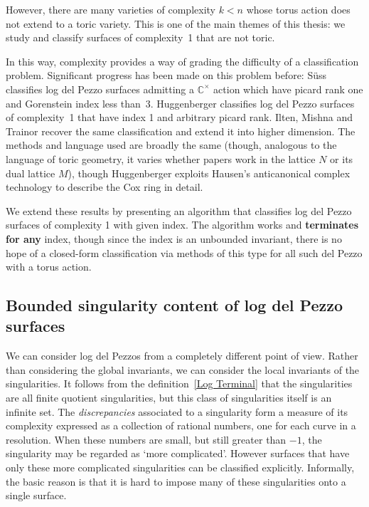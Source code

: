 \documentclass[12pt,a4paper]{book}      %
\theoremstyle{definition}
\begin{document}
However, there are many varieties of complexity $k<n$ whose torus action does not extend to a toric variety. This is one of the main themes of this thesis: we study
and classify surfaces of complexity~1 that are not toric.

In this way, complexity provides a way of grading the difficulty of a classification problem. Significant progress has been made on this problem before: S\"{u}ss \cite{Suss} classifies log del Pezzo surfaces admitting a $\mathbb{C}^\times$ action which have picard rank one and Gorenstein index less than~3. Huggenberger \cite{Huggenberger} classifies log del Pezzo surfaces of complexity~1 that have index 1 and arbitrary picard rank. Ilten, Mishna and Trainor \cite{IMT} recover the same classification and extend it into higher dimension. The methods and language used are broadly the same (though, analogous to the language of toric geometry, it varies whether papers work in the lattice $N$ or its dual lattice $M$), though Huggenberger exploits Hausen's anticanonical complex technology to describe the Cox ring in detail. 

We extend these results by presenting an algorithm that classifies
log del Pezzo surfaces of complexity 1 with given index.
The algorithm works and \textbf{terminates for any} index, 
though since the index is an unbounded invariant, there is no hope of 
a closed-form classification via methods of this type for all such del Pezzo with a torus action.



\subsection{Bounded singularity content of log del Pezzo surfaces}

We can consider log del Pezzos from a completely different point of view. Rather than considering the global invariants, we can consider the local invariants of the singularities. 
It follows from the definition~\ref{Log Terminal} that the singularities
are all finite quotient singularities, but this class of singularities itself is an infinite set. 
The {\em discrepancies} associated to a singularity form a measure of
its complexity expressed as a collection of rational numbers, one for each curve in a resolution. 
When these numbers are small, but still greater than $-1$, the singularity may be regarded as `more complicated'. 
However surfaces that have only these more complicated singularities can be classified explicitly. Informally,
the basic reason is that it is hard to impose many of these singularities onto a single surface.
\end{document}
